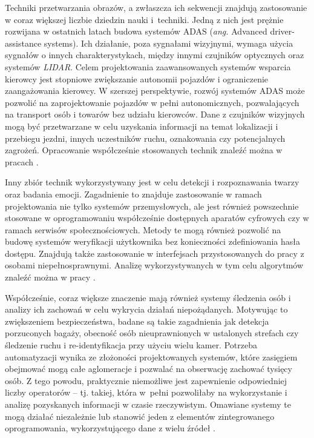 Techniki przetwarzania obrazów, a zwłaszcza ich sekwencji znajdują zastosowanie w coraz większej liczbie dziedzin nauki i~techniki.
Jedną z nich jest prężnie rozwijana w ostatnich latach budowa systemów ADAS (\emph{ang.} Advanced driver-assistance systems).
Ich działanie, poza sygnałami wizyjnymi, wymaga użycia sygnałów o innych charakterystykach, między innymi czujników optycznych oraz systemów \emph{LIDAR}. %
Celem projektowania zaawansowanych systemów wsparcia kierowcy jest stopniowe zwiększanie autonomii pojazdów i ograniczenie zaangażowania kierowcy. W szerszej perspektywie, rozwój systemów ADAS może pozwolić na zaprojektowanie pojazdów w pełni autonomicznych, pozwalających na transport osób i towarów bez udziału kierowców.
Dane z czujników wizyjnych mogą być przetwarzane w celu uzyskania informacji na temat lokalizacji i przebiegu jezdni, innych uczestników ruchu, oznakowania czy potencjalnych zagrożeń. 
Opracowanie współcześnie stosowanych technik znaleźć można w pracach \cite{Bengler2014,Velez2017}.

Inny zbiór technik wykorzystywany jest w celu detekcji i rozpoznawania twarzy oraz badania emocji.
Zagadnienie to znajduje zastosowanie w ramach projektowania nie tylko systemów przemysłowych, ale jest również powszechnie stosowane w oprogramowaniu współcześnie dostępnych aparatów cyfrowych czy w ramach serwisów społecznościowych. 
Metody te mogą również pozwolić na budowę systemów weryfikacji użytkownika bez konieczności zdefiniowania hasła dostępu. 
Znajdują także zastosowanie w interfejsach przystosowanych do pracy z osobami niepełnosprawnymi.
Analizę wykorzystywanych w tym celu algorytmów znaleźć można w pracy \cite{Anil2016}.

Współcześnie, coraz większe znaczenie mają również systemy śledzenia osób i analizy ich zachowań w celu wykrycia działań niepożądanych.
Motywując to zwiększeniem bezpieczeństwa, badane są takie zagadnienia jak detekcja porzuconych bagaży, obecność osób nieuprawnionych w ustalonych strefach czy śledzenie ruchu i re-identyfikacja przy użyciu wielu kamer.
Potrzeba automatyzacji wynika ze złożoności projektowanych systemów, które zasięgiem obejmować mogą całe aglomeracje i pozwalać na obserwację zachować tysięcy osób. 
Z tego powodu, praktycznie niemożliwe jest zapewnienie odpowiedniej liczby operatorów -- tj. takiej, która w~pełni pozwoliłaby na wykorzystanie i analizę pozyskanych informacji w czasie rzeczywistym. 
Omawiane systemy te mogą działać niezależnie lub stanowić jeden z elementów zintegrowanego oprogramowania, wykorzystującego dane z wielu źródeł \cite{Sriram2016,Hussain2016,Gouo2015}.


